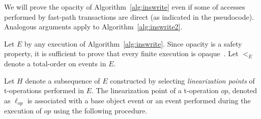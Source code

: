 %
We will prove the opacity of Algorithm~\ref{alg:inswrite} even if some of accesses performed by fast-path transactions are direct (as indicated in the pseudocode).
Analogous arguments apply to Algorithm~\ref{alg:inswrite2}.
%

Let $E$ by any execution of Algorithm~\ref{alg:inswrite}. 
Since opacity is a safety property, it is sufficient to prove that every finite execution is opaque~\cite{icdcs-opacity}.
Let $<_E$ denote a total-order on events in $E$.

Let $H$ denote a subsequence of $E$ constructed by selecting
\emph{linearization points} of t-operations performed in $E$.
The linearization point of a t-operation $op$, denoted as $\ell_{op}$ is associated with  
a base object event or an event performed during 
the execution of $op$ using the following procedure. 

